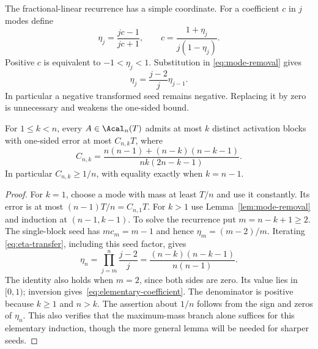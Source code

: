 The fractional-linear recurrence has a simple coordinate. For a coefficient
$c$ in $j$ modes define
\[
 \eta_j=\frac{jc-1}{jc+1},\qquad
 c=\frac{1+\eta_j}{j(1-\eta_j)}.
\]
Positive $c$ is equivalent to $-1<\eta_j<1$. Substitution in
\eqref{eq:mode-removal} gives
\begin{equation}\label{eq:eta-transfer}
 \eta_j=\frac{j-2}{j}\eta_{j-1}.
\end{equation}
In particular a negative transformed seed remains negative. Replacing it
by zero is unnecessary and weakens the one-sided bound.

\begin{theorem}
\label{thm:general-coefficient}
For $1\le k<n$, every $A\in\Acal_n(T)$ admits at most $k$ distinct
activation blocks with one-sided error at most $C_{n,k}T$, where
\begin{equation}\label{eq:elementary-coefficient}
 C_{n,k}=\frac{n(n-1)+(n-k)(n-k-1)}{nk(2n-k-1)}.
\end{equation}
In particular $C_{n,k}\ge1/n$, with equality exactly when $k=n-1$.
\end{theorem}
\begin{proof}
For $k=1$, choose a mode with mass at least $T/n$ and use it constantly.
Its error is at most $(n-1)T/n=C_{n,1}T$. For $k>1$ use
Lemma~\ref{lem:mode-removal} and induction at $(n-1,k-1)$. To solve
the recurrence put $m=n-k+1\ge2$. The single-block seed has
$mc_m=m-1$ and hence $\eta_m=(m-2)/m$. Iterating
\eqref{eq:eta-transfer}, including this seed factor, gives
\[
 \eta_n=\prod_{j=m}^n\frac{j-2}{j}
       =\frac{(n-k)(n-k-1)}{n(n-1)}.
\]
The identity also holds when $m=2$, since both sides are zero. Its value
lies in $[0,1)$; inversion gives~\eqref{eq:elementary-coefficient}.
The denominator is positive because $k\ge1$ and $n>k$. The assertion
about $1/n$ follows from the sign and zeros of $\eta_n$. This also
verifies that the maximum-mass branch alone suffices for this elementary
induction, though the more general lemma will be needed for sharper seeds.
\end{proof}

